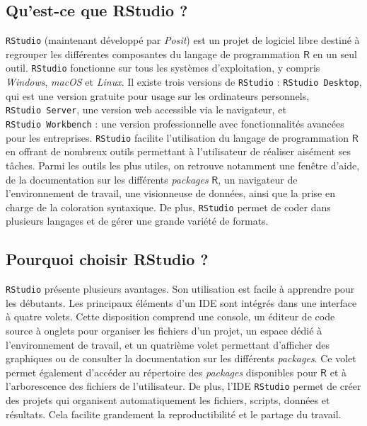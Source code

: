 \documentclass[
  letterpaper,
  DIV=11,
  numbers=noendperiod,
  oneside]{scrreprt}
\begin{document}
\hypertarget{quest-ce-que-rstudio}{%
\subsection{Qu'est-ce que RStudio ?}\label{quest-ce-que-rstudio}}

\texttt{RStudio} (maintenant développé par \emph{Posit}) est un projet
de logiciel libre destiné à regrouper les différentes composantes du
langage de programmation \(\textsf{R}\) en un seul outil.
\texttt{RStudio} fonctionne sur tous les systèmes d'exploitation, y
compris \emph{Windows}, \emph{macOS} et \emph{Linux}. Il existe trois
versions de \texttt{RStudio} : \texttt{RStudio\ Desktop}, qui est une
version gratuite pour usage sur les ordinateurs personnels,
\texttt{RStudio\ Server}, une version web accessible via le navigateur,
et \texttt{RStudio\ Workbench} : une version professionnelle avec
fonctionnalités avancées pour les entreprises. \texttt{RStudio} facilite
l'utilisation du langage de programmation \(\textsf{R}\) en offrant de
nombreux outils permettant à l'utilisateur de réaliser aisément ses
tâches. Parmi les outils les plus utiles, on retrouve notamment une
fenêtre d'aide, de la documentation sur les différents \emph{packages}
\(\textsf{R}\), un navigateur de l'environnement de travail, une
visionneuse de données, ainsi que la prise en charge de la coloration
syntaxique. De plus, \texttt{RStudio} permet de coder dans plusieurs
langages et de gérer une grande variété de formats.

\hypertarget{pourquoi-choisir-rstudio}{%
\subsection{Pourquoi choisir RStudio ?}\label{pourquoi-choisir-rstudio}}

\texttt{RStudio} présente plusieurs avantages. Son utilisation est
facile à apprendre pour les débutants. Les principaux éléments d'un IDE
sont intégrés dans une interface à quatre volets. Cette disposition
comprend une console, un éditeur de code source à onglets pour organiser
les fichiers d'un projet, un espace dédié à l'environnement de travail,
et un quatrième volet permettant d'afficher des graphiques ou de
consulter la documentation sur les différents \emph{packages}. Ce volet
permet également d'accéder au répertoire des \emph{packages} disponibles
pour \(\textsf{R}\) et à l'arborescence des fichiers de l'utilisateur.
De plus, l'IDE \texttt{RStudio} permet de créer des projets qui
organisent automatiquement les fichiers, scripts, données et résultats.
Cela facilite grandement la reproductibilité et le partage du travail.
\end{document}
